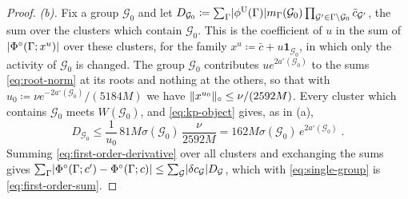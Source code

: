 \documentclass[11pt]{preprint}
\DeclarePairedDelimiter{\abs}{\lvert}{\rvert}
\DeclarePairedDelimiter{\norm}{\lVert}{\rVert}
\numberwithin{equation}{section}
\theoremstyle{definition}
\theoremstyle{remark}
\theoremstyle{plain}
\begin{document}
\begin{proof}
\emph{(b).} Fix a group $\mathcal G_0$ and let $D_{\mathcal G_0} \coloneqq \sum_\Gamma\abs{\phi^{\mathrm U}(\Gamma)}m_\Gamma(\mathcal G_0)\prod_{\mathcal G' \in \Gamma \setminus \mathcal G_0}\bar c_{\mathcal G'}$, the sum over the clusters which contain $\mathcal G_0$. This is the coefficient of $u$ in the sum of $\abs{\Phi^\circ(\Gamma; x^u)}$ over these clusters, for the family $x^u \coloneqq \bar c + u\mathbf 1_{\mathcal G_0}$, in which only the activity of $\mathcal G_0$ is changed. The group $\mathcal G_0$ contributes $ue^{2a^\circ(\mathcal G_0)}$ to the sums \eqref{eq:root-norm} at its roots and nothing at the others, so that with $u_0 \coloneqq \nu e^{-2a^\circ(\mathcal G_0)}/(5184M)$ we have $\norm{x^{u_0}}_\circ \leq \nu/(2592M)$. Every cluster which contains $\mathcal G_0$ meets $W(\mathcal G_0)$, and \eqref{eq:kp-object} gives, as in (a),
\begin{equation}\label{eq:single-group}
    D_{\mathcal G_0} \leq \frac{1}{u_0}\,81M\sigma(\mathcal G_0)\,\frac{\nu}{2592M} = 162M\sigma(\mathcal G_0)\,e^{2a^\circ(\mathcal G_0)}\;.
\end{equation}
Summing \eqref{eq:first-order-derivative} over all clusters and exchanging the sums gives $\sum_\Gamma\abs{\Phi^\circ(\Gamma; c') - \Phi^\circ(\Gamma; c)} \leq \sum_{\mathcal G}\abs{\delta c_{\mathcal G}}D_{\mathcal G}$, which with \eqref{eq:single-group} is \eqref{eq:first-order-sum}.


\end{proof}
\end{document}
